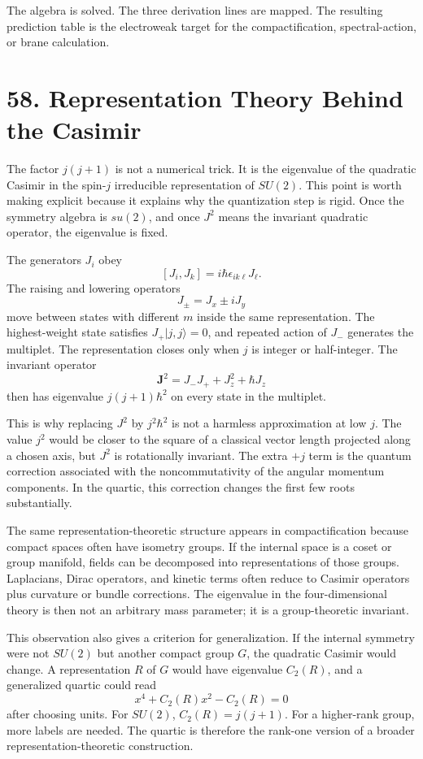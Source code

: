 \documentclass[11pt]{article}
\newcommand{\hb}{\hbar}
\begin{document}
The algebra is solved. The three derivation lines are mapped. The resulting prediction table is the electroweak target for the compactification, spectral-action, or brane calculation.

\section*{58. Representation Theory Behind the Casimir}

The factor \(j(j+1)\) is not a numerical trick. It is the eigenvalue of the quadratic Casimir in the spin-\(j\) irreducible representation of \(SU(2)\). This point is worth making explicit because it explains why the quantization step is rigid. Once the symmetry algebra is \(su(2)\), and once \(J^2\) means the invariant quadratic operator, the eigenvalue is fixed.

The generators \(J_i\) obey
\[
        [J_i,J_k]=i\hb\epsilon_{ik\ell}J_\ell .
\]
The raising and lowering operators
\[
        J_\pm=J_x\pm iJ_y
\]
move between states with different \(m\) inside the same representation. The highest-weight state satisfies \(J_+|j,j\rangle=0\), and repeated action of \(J_-\) generates the multiplet. The representation closes only when \(j\) is integer or half-integer. The invariant operator
\[
        \mathbf{J}^2=J_-J_+ + J_z^2+\hb J_z
\]
then has eigenvalue \(j(j+1)\hb^2\) on every state in the multiplet.

This is why replacing \(J^2\) by \(j^2\hb^2\) is not a harmless approximation at low \(j\). The value \(j^2\) would be closer to the square of a classical vector length projected along a chosen axis, but \(J^2\) is rotationally invariant. The extra \(+j\) term is the quantum correction associated with the noncommutativity of the angular momentum components. In the quartic, this correction changes the first few roots substantially.

The same representation-theoretic structure appears in compactification because compact spaces often have isometry groups. If the internal space is a coset or group manifold, fields can be decomposed into representations of those groups. Laplacians, Dirac operators, and kinetic terms often reduce to Casimir operators plus curvature or bundle corrections. The eigenvalue in the four-dimensional theory is then not an arbitrary mass parameter; it is a group-theoretic invariant.

This observation also gives a criterion for generalization. If the internal symmetry were not \(SU(2)\) but another compact group \(G\), the quadratic Casimir would change. A representation \(R\) of \(G\) would have eigenvalue \(C_2(R)\), and a generalized quartic could read
\[
        x^4+C_2(R)x^2-C_2(R)=0
\]
after choosing units. For \(SU(2)\), \(C_2(R)=j(j+1)\). For a higher-rank group, more labels are needed. The quartic is therefore the rank-one version of a broader representation-theoretic construction.
\end{document}
